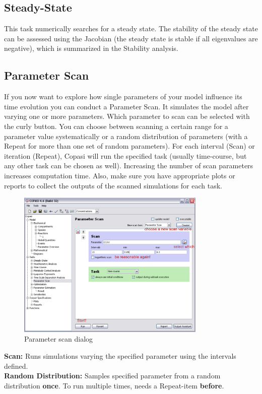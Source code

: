 \documentclass[a4paper,11pt,twoside]{article}
\begin{document}
\subsection{Steady-State}
\label{sub:ss}
This task numerically searches for a steady state. The stability of the steady state can be assessed using the Jacobian (the steady state is stable if all eigenvalues are negative), which is summarized in the Stability analysis.

\subsection{Parameter Scan}
\label{sub:PS}
If you now want to explore how single parameters of your model influence its time evolution you can conduct a Parameter Scan. It simulates the model after varying one or more parameters. Which parameter to scan can be selected with the curly button. You can choose between scanning a certain range for a parameter value systematically or a random distribution of parameters (with a Repeat for more than one set of random parameters). For each interval (Scan) or iteration (Repeat), Copasi will run the specified task (usually time-course, but any other task can be chosen as well). Increasing the number of scan parameters increases computation time. Also, make sure you have appropriate plots or reports to collect the outputs of the scanned simulations for each task.\\

\begin{figure}[htb]
 \centering
 \includegraphics[width=09cm]{Pictures/ParameterScan.pdf}
 \caption{\footnotesize Parameter scan dialog}
 \label{fig:PS}
\end{figure}

\textbf{Scan:} Runs simulations varying the specified parameter using the intervals defined.\\
\textbf{Random Distribution:} Samples specified parameter from a random distribution \textbf{once}.  To run multiple times, needs a Repeat-item \textbf{before}.
\end{document}
